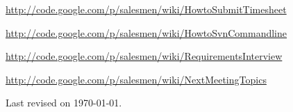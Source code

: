 \documentclass[a4paper, 12pt]{article}
\begin{document}
			
		
	
	
	\begin{thebibliography}{99}
		
		\href{http://code.google.com/p/salesmen/wiki/HowtoSubmitTimesheet}{http://code.google.com/p/salesmen/wiki/HowtoSubmitTimesheet}

		\href{http://code.google.com/p/salesmen/wiki/HowtoSvnCommandline}{http://code.google.com/p/salesmen/wiki/HowtoSvnCommandline}

		\href{http://code.google.com/p/salesmen/wiki/RequirementsInterview}{http://code.google.com/p/salesmen/wiki/RequirementsInterview}
		
		\href{http://code.google.com/p/salesmen/wiki/NextMeetingTopics}{http://code.google.com/p/salesmen/wiki/NextMeetingTopics}
		
	\end{thebibliography}	
	
	\begin{center}
	 	Last revised on \today.
	\end{center}
	
	
\end{document}
